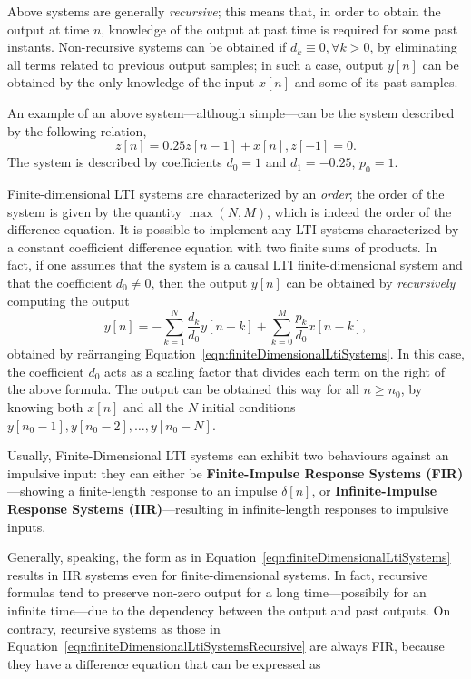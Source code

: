 \documentclass[\documentfontsize, twocolumn]{\classname}
\begin{document}
Above systems are generally \emph{recursive}; this means that, in order to
obtain the output at time $n$, knowledge of the output at past time is required
for some past instants. Non-recursive systems can be obtained if $d_k \equiv 0,
\forall k > 0$, by eliminating all terms related to previous output samples; in
such a case, output $y[n]$ can be obtained by the only knowledge of the input
$x[n]$ and some of its past samples.

An example of an above system---although simple---can be the system described
by the following relation, \[ z[n] = 0.25z[n-1] + x[n], z[-1] = 0. \] The
system is described by coefficients $d_0 = 1$ and $d_1 = -0.25$, $p_0 = 1$.


Finite-dimensional LTI systems are characterized by an \emph{order}; the order
of the system is given by the quantity $\max {(N,M)}$, which is indeed the
order of the difference equation. It is possible to implement any LTI systems
characterized by a constant coefficient difference equation with two finite
sums of products. In fact, if one assumes that the system is a causal LTI
finite-dimensional system and that the coefficient $d_0 \neq 0$, then the
output $y[n]$ can be obtained by \emph{recursively} computing the output
\begin{equation}\label{eqn:finiteDimensionalLtiSystemsRecursive}
    y[n]= -\sum_{k=1}^N \frac {d_k}{d_0} y[n-k] + \sum_{k=0}^M \frac{p_k}{d_0} x[n-k],
\end{equation}
obtained by re\"arranging Equation~\ref{eqn:finiteDimensionalLtiSystems}.
In this case, the coefficient $d_0$ acts as a scaling factor that divides each
term on the right of the above formula.
The output can be obtained this way for all $n \geq n_0$, by knowing both
$x[n]$ and all the $N$ initial conditions $y[n_0-1], y[n_0-2],\dots,y[n_0-N]$.

Usually, Finite-Dimensional LTI systems can exhibit two behaviours against an
impulsive input: they can either be \textbf{Finite-Impulse Response Systems
(FIR)}---showing a finite-length response to an impulse $\delta[n]$, or
\textbf{Infinite-Impulse Response Systems (IIR)}---resulting in infinite-length
responses to impulsive inputs.

Generally, speaking, the form as in
Equation~\ref{eqn:finiteDimensionalLtiSystems} results in IIR systems even for
finite-dimensional systems. In fact, recursive formulas tend to preserve
non-zero output for a long time---possibily for an infinite time---due to the
dependency between the output and past outputs.
On contrary, recursive systems as those in
Equation~\ref{eqn:finiteDimensionalLtiSystemsRecursive} are
always FIR, because they have a difference equation that can be expressed as
\end{document}
